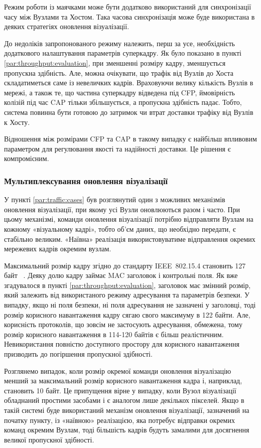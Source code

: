 \documentclass[a4paper,ukrainian,utf8,nocolumnsxix,floatsection]{eskdtext}
\renewcommand\paragraph{\subsubsection}
\newcommand{\iee}[0]{IEEE~802.15.4\xspace}
\begin{document}
Режим роботи із маячками може бути додатково використаний для синхронізації часу між Вузлами та Хостом. Така часова синхронізація може буде використана в деяких стратегіях оновлення візуалізації.

До недоліків запропонованого режиму належить, перш за усе, необхідність додаткового налаштування параметрів суперкадру. Як було показано в пункті \ref{par:throughput:evaluation}, при зменшенні розміру кадру, зменшується пропускна здібність. Але, можна очікувати, що трафік від Вузлів до Хоста складатиметься саме із невеличких кадрів. Враховуючи велику кількість Вузлів в мережі, а також те, що частина суперкадру відведена під CFP, ймовірність колізій під час CAP тільки збільшується, а пропускна здібність падає. Тобто, система повинна бути готовою до затримок чи втрат доставки трафіку від Вузлів к Хосту. 

Відношення між розмірами CFP та CAP в такому випадку є найбільш впливовим параметром для регулювання якості та надійності доставки. Це рішення є компромісним.

\paragraph{Мультиплексування оновлення візуалізації}

У пункті \ref{par:traffic:cases} був розглянутий один з можливих механізмів оновлення візуалізації, при якому усі Вузли оновлюються разом і часто. При цьому механізмі, команди оновлення візуалізації  потрібно відправляти Вузлам на кожному «візуальному кадрі», тобто об’єм даних, що необхідно передати, є стабільно великим. «Наївна» реалізація використовуватиме відправлення окремих мережевих кадрів окремим вузлам.

Максимальний розмір кадру згідно до стандарту \iee становить 127 байт ~\cite{ieee:802:15:4:2011}. Деяку долю кадру займає MAC заголовок і контрольні поля. Як вже згадувалося в пункті \ref{par:throughput:evaluation}, заголовок має змінний розмір, який залежить від використаного режиму адресування та параметрів безпеки. У випадку, якщо ні поля безпеки, ні поля адресування не зазначені у заголовці, тоді розмір корисного навантаження кадру сягаю свого максимуму в 122 байти. Але, корисність протоколів, що зовсім не застосують адресування, обмежена, тому розмір корисного навантаження в 114-120 байтів є більш реалістичним. Невикористання повністю доступного простору для корисного навантаження призводить до погіршення пропускної здібності.

Розглянемо випадок, коли розмір окремої команди оновлення візуалізацію менший за максимальний розмір корисного навантаження кадра і, наприклад, становить 10 байт. Це припущення вірне у випадку, коли Вузол візуалізації обладнаний простими засобами і є аналогом лише декількох пікселей. Якщо в такій системі буде використаний механізм оновлення візуалізації, зазначений на початку пункту, із «наївною» реалізацією, яка потребує відправки окремих команд окремим Вузлам, тоді більшість кадрів будуть замалими для досягнення великої пропускної здібності.
\end{document}
